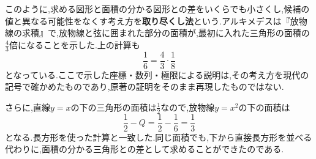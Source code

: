 このように,求める図形と面積の分かる図形との差をいくらでも小さくし,候補の値と異なる可能性をなくす考え方を\textbf{取り尽くし法}という.アルキメデスは『放物線の求積』で,放物線と弦に囲まれた部分の面積が,最初に入れた三角形の面積の$\frac43$倍になることを示した.上の計算も
\[
 \frac16=\frac43\cdot\frac18
\]
となっている.ここで示した座標・数列・極限による説明は,その考え方を現代の記号で確かめたものであり,原著の証明をそのまま再現したものではない.

さらに,直線$y=x$の下の三角形の面積は$\frac12$なので,放物線$y=x^2$の下の面積は
\[
 \frac12-Q=\frac12-\frac16=\frac13
\]
となる.長方形を使った計算と一致した.同じ面積でも,下から直接長方形を並べる代わりに,面積の分かる三角形との差として求めることができたのである.
